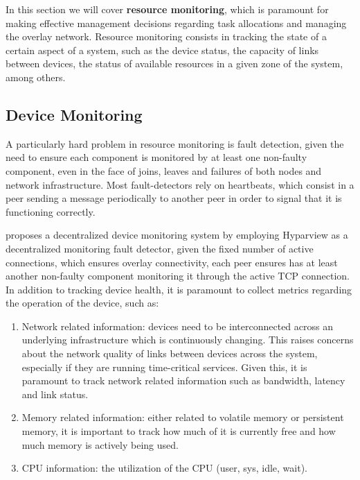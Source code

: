 
In this section we will cover \textbf{resource monitoring}, which is paramount for making effective management decisions regarding task allocations and managing the overlay network. Resource monitoring consists in tracking the state of a certain aspect of a system, such as the device status, the capacity of links between devices, the status of available resources in a given zone of the system, among others. 

\subsection{Device Monitoring}

A particularly hard problem in resource monitoring is fault detection, given the need to ensure each component is monitored by at least one non-faulty component, even in the face of joins, leaves and failures of both nodes and network infrastructure. Most fault-detectors rely on heartbeats, which consist in a peer sending a message periodically to another peer in order to signal that it is functioning correctly.

\textcite{leitao2008large} proposes a decentralized device monitoring system by employing Hyparview \cite{Hyparview} as a decentralized monitoring fault detector, given the fixed number of active connections, which ensures overlay connectivity, each peer ensures has at least another non-faulty component monitoring it through the active TCP connection. In addition to tracking device health, it is paramount to collect metrics regarding the operation of the device, such as:

\begin{enumerate}

    \item Network related information: devices need to be interconnected across an underlying infrastructure which is continuously changing. This raises concerns about the network quality of links between devices across the system, especially if they are running time-critical services. Given this, it is paramount to track network related information such as bandwidth, latency and link status.
    
    \item Memory related information: either related to volatile memory or persistent memory, it is important to track how much of it is currently free and how much memory is actively being used.
    
    \item CPU information: the utilization of the CPU (user, sys, idle, wait).
    
\end{enumerate}

